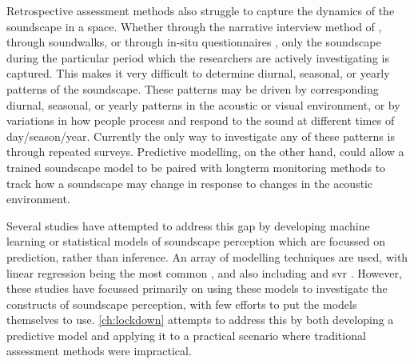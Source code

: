 Retrospective assessment methods also struggle to capture the dynamics of the soundscape in a space. Whether through the narrative interview method of \citet[Sec. 5.4]{ISO12913Part2}, through soundwalks, or through in-situ questionnaires \citep{Mitchell2020Soundscape}, only the soundscape during the particular period which the researchers are actively investigating is captured. This makes it very difficult to determine diurnal, seasonal, or yearly patterns of the soundscape. These patterns may be driven by corresponding diurnal, seasonal, or yearly patterns in the acoustic or visual environment, or by variations in how people process and respond to the sound at different times of day/season/year. Currently the only way to investigate any of these patterns is through repeated surveys. Predictive modelling, on the other hand, could allow a trained soundscape model to be paired with longterm monitoring methods to track how a soundscape may change in response to changes in the acoustic environment.

Several studies have attempted to address this gap by developing machine learning or statistical models of soundscape perception which are focussed on prediction, rather than inference. An array of modelling techniques are used, with linear regression being the most common \citep{Lionello2020systematic}, and also including  \citep{Yu2009Modeling,PuyanaRomero2016Modelling} and \gls{svr} \citep{Giannakopoulos2019Athens,Fan2016Automatic,Fan2017Emo}. However, these studies have focussed primarily on using these models to investigate the constructs of soundscape perception, with few efforts to put the models themselves to use. \cref{ch:lockdown} attempts to address this by both developing a predictive model and applying it to a practical scenario where traditional assessment methods were impractical.

